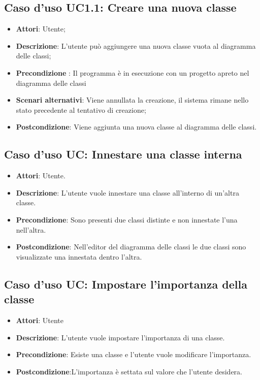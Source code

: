 \documentclass[../AnalisiDeiRequisiti.tex]{subfiles}
\begin{document}
	\subsection{Caso d'uso UC1.1: Creare una nuova classe}
	\begin{itemize}
		\item \textbf{Attori}: Utente;
		
		\item \textbf{Descrizione}: L'utente può aggiungere una nuova classe vuota al diagramma delle classi;
		
		\item \textbf{Precondizione }: Il programma è in esecuzione con un progetto apreto nel diagramma delle classi
		
		
		\item \textbf{Scenari alternativi}: Viene annullata la creazione, il sistema
		rimane nello stato precedente al tentativo di creazione;
		
		\item \textbf{Postcondizione}: Viene aggiunta una nuova classe al diagramma delle classi.
	\end{itemize}
	
		\subsection{Caso d'uso UC: Innestare una classe interna}
		\begin{itemize}
			\item\textbf{Attori}: Utente.
			\item\textbf{Descrizione}: L'utente vuole innestare una classe all'interno di un'altra classe.
			\item\textbf{Precondizione}: Sono presenti due classi distinte e non innestate l'una nell'altra.
			\item\textbf{Postcondizione}: Nell'editor del diagramma delle classi le due classi sono visualizzate una innestata dentro l'altra.	
		\end{itemize}
		
		\subsection{Caso d'uso UC: Impostare l'importanza della classe}
		\begin{itemize}
			\item\textbf{Attori}: Utente
			\item\textbf{Descrizione}: L'utente vuole impostare l'importanza di una classe.
			\item\textbf{Precondizione}: Esiste una classe e l'utente vuole modificare l'importanza.
			\item\textbf{Postcondizione}:L'importanza è settata sul valore che l'utente desidera.
		\end{itemize}
		
\end{document}
